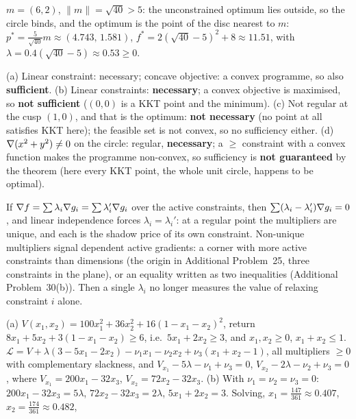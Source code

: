 \begin{solutions}
        $m=(6,2)$, $\|m\|=\sqrt{40}>5$: the unconstrained optimum lies
        outside, so the circle binds, and the optimum is the point of the
        disc nearest to $m$: $p^*=\tfrac{5}{\sqrt{40}}m\approx(4.743,\,1.581)$,
        $f^*=2(\sqrt{40}-5)^{2}+8\approx11.51$, with
        $\lambda=0.4(\sqrt{40}-5)\approx0.53\ge0$.
  \item (a) Linear constraint: necessary; concave objective: a convex
        programme, so also \textbf{sufficient}. (b) Linear constraints:
        \textbf{necessary}; a convex objective is maximised, so
        \textbf{not sufficient} ($(0,0)$ is a KKT point and the minimum).
        (c) Not regular at the cusp $(1,0)$, and that is the optimum:
        \textbf{not necessary} (no point at all satisfies KKT here); the
        feasible set is not convex, so no sufficiency either. (d)
        $\nabla(x^{2}+y^{2})\neq0$ on the circle: regular, \textbf{necessary};
        a $\ge$ constraint with a convex function makes the programme
        non-convex, so sufficiency is \textbf{not guaranteed} by the theorem
        (here every KKT point, the whole unit circle, happens to be optimal).
  \item If $\nabla f=\sum\lambda_i\nabla g_i=\sum\lambda_i'\nabla g_i$ over the
        active constraints, then $\sum(\lambda_i-\lambda_i')\nabla g_i=0$, and
        linear independence forces $\lambda_i=\lambda_i'$: at a regular point
        the multipliers are unique, and each is the shadow price of its own
        constraint. Non-unique multipliers signal dependent active
        gradients: a corner with more active constraints than dimensions
        (the origin in Additional Problem~25, three constraints in the
        plane), or an equality written as two inequalities (Additional
        Problem~30(b)). Then a single $\lambda_i$ no longer measures the
        value of relaxing constraint $i$ alone.
  \item (a) $V(x_1,x_2)=100x_1^{2}+36x_2^{2}+16(1-x_1-x_2)^{2}$, return
        $8x_1+5x_2+3(1-x_1-x_2)\ge6$, i.e.\ $5x_1+2x_2\ge3$, and $x_1,x_2\ge0$,
        $x_1+x_2\le1$. $\mathcal{L}=V+\lambda(3-5x_1-2x_2)-\nu_1x_1-\nu_2x_2+\nu_3(x_1+x_2-1)$,
        all multipliers $\ge0$ with complementary slackness, and
        $V_{x_1}-5\lambda-\nu_1+\nu_3=0$, $V_{x_2}-2\lambda-\nu_2+\nu_3=0$,
        where $V_{x_1}=200x_1-32x_3$, $V_{x_2}=72x_2-32x_3$.
        (b) With $\nu_1=\nu_2=\nu_3=0$: $200x_1-32x_3=5\lambda$,
        $72x_2-32x_3=2\lambda$, $5x_1+2x_2=3$. Solving,
        $x_1=\tfrac{147}{361}\approx0.407$, $x_2=\tfrac{174}{361}\approx0.482$,

\end{solutions}
